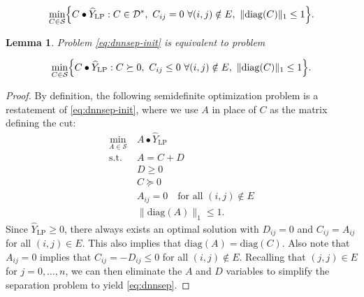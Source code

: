 \documentclass[10pt,a4paper]{amsart}
\newtheorem{lemma}{Lemma}
\newcommand{\jim}[1]{{ \oo{[Jim comment: #1}]}}
\newcommand{\matip}[2]{#1 \bullet #2}
\newcommand{\oo}[1]{{\textcolor{blue}{#1}}}
\newcommand{\ooc}[1]{{ \oo{[OG comment: #1}]}}
\begin{document}
	\begin{equation}
		\label{eq:dnnsep-init}
		\min_{C \in \mathcal S} \Bigl\{ \matip{C}{\widehat{Y}_{\mathrm{LP}}}  : C \in \mathcal{D}^*, \ C_{ij} = 0 \ \forall(i,j) \notin E, \ \| \mathrm{diag}(C) \|_1  \leq 1 \Bigr\}.
	\end{equation}

	\begin{lemma}
		\label{lem:dnnform}
		Problem \eqref{eq:dnnsep-init} is equivalent to problem 
		
		\begin{equation}
			\label{eq:dnnsep}
			\min_{{C\in \mathcal S}} \Bigl\{ \matip{C}{\widehat{Y}_{\mathrm{LP}}} : C \succeq 0, \ C_{ij} \leq 0 \ \forall(i,j) \notin E, \ \| \mathrm{diag}(C)\|_1 \leq 1 \Bigr\} .
		\end{equation}
	\end{lemma}

	\begin{proof}
		By definition, the following semidefinite optimization problem is a restatement of %
		\eqref{eq:dnnsep-init}, where we use $A$ in place of $C$ as the matrix defining the cut:
		\begin{align*}
			\min_{{A\in \mathcal S}} \ & \matip{A}{\widehat{Y}_{\mathrm{LP}}}  \\
			\text{s.t. } & A = C +D \\
			& D \geq 0 \\
			& C \succeq 0\\
			& A_{ij} = 0 \quad \text{for all } (i,j) \notin E\\
			& \| \mathrm{diag}(A) \|_1 \leq 1 .
		\end{align*}
		Since $\widehat{Y}_{\mathrm{LP}} \geq 0$,  there always exists an optimal solution with $D_{ij} = 0$ and $C_{ij} = A_{ij}$  for all $(i,j) \in E$.
		This also implies that $\mathrm{diag}(A)=\mathrm{diag}(C)$. Also note that $A_{ij} = 0$ implies that $C_{ij} = -D_{ij}\le 0$ for all $(i,j) \notin E$. 
		Recalling that $(j,j) \in E$ for $j=0,\ldots,n$, we can then eliminate the $A$ and $D$ variables to  simplify the separation problem to yield \eqref{eq:dnnsep}.
	\end{proof}
\end{document}
